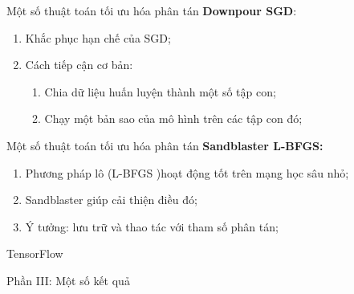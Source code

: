 \documentclass[notheorems,hyperref={bookmarks=true}]{beamer}
\theoremstyle{plain}
\numberwithin{equation}{section}
\begin{document}
\begin{footnotesize}
\begin{frame}{Một số thuật toán tối ưu hóa phân tán}
\textbf{Downpour SGD}:\\ \pause
\begin{enumerate}[i]
	\item Khắc phục hạn chế của SGD;\pause
	\item Cách tiếp cận cơ bản:\pause
	\begin{enumerate}[-]
		\item Chia dữ liệu huấn luyện thành một số tập con;\pause
		\item Chạy một bản sao của mô hình trên các tập con đó;\pause
	\end{enumerate}
\end{enumerate}
\end{frame}

\begin{frame}{Một số thuật toán tối ưu hóa phân tán}
\textbf{Sandblaster L-BFGS:} \\ \pause
\begin{enumerate}[-]
	\item Phương pháp lô (L-BFGS )hoạt động tốt trên mạng học sâu nhỏ; 
	\item Sandblaster giúp cải thiện điều đó;\pause
	\item Ý tưởng: lưu trữ và thao tác với tham số phân tán; 
\end{enumerate}
\end{frame}

\begin{frame}
\begin{center}

	\Large TensorFlow

\end{center}

\end{frame}

\begin{frame}

\Large Phần III: Một số kết quả

\end{frame}


\end{footnotesize}
\end{document}
